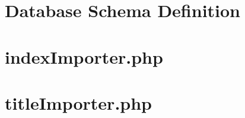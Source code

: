 \newpage \appendix \appendixpage \addappheadtotoc
\section{Database Schema Definition}


\section{indexImporter.php}


\section{titleImporter.php}

